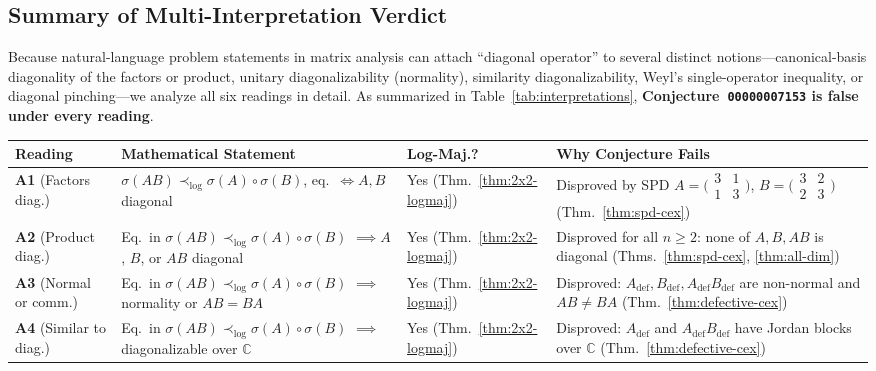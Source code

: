 \documentclass[11pt,a4paper]{article}
\theoremstyle{definition}
\newcommand{\C}{\mathbb{C}}
\begin{document}
\subsection{Summary of Multi-Interpretation Verdict}

Because natural-language problem statements in matrix analysis can attach ``diagonal operator'' to several distinct notions---canonical-basis diagonality of the factors or product, unitary diagonalizability (normality), similarity diagonalizability, Weyl's single-operator inequality, or diagonal pinching---we analyze all six readings in detail. As summarized in Table~\ref{tab:interpretations}, \textbf{Conjecture~\texttt{00000007153} is false under every reading}.

\begin{table}[ht]
\centering
\footnotesize
\begin{tabular}{@{}>{\raggedright\arraybackslash}p{2.6cm}>{\raggedright\arraybackslash}p{4.7cm}l>{\raggedright\arraybackslash}p{5.1cm}@{}}
\toprule
\textbf{Reading} & \textbf{Mathematical Statement} & \textbf{Log-Maj.?} & \textbf{Why Conjecture Fails} \\
\midrule
\textbf{A1} (Factors diag.) & $\sigma(AB) \prec_{\log} \sigma(A)\circ\sigma(B)$, eq.\ $\iff A, B$ diagonal & Yes (Thm.~\ref{thm:2x2-logmaj}) & Disproved by SPD $A=\bigl(\begin{smallmatrix}3&1\\1&3\end{smallmatrix}\bigr)$, $B=\bigl(\begin{smallmatrix}3&2\\2&3\end{smallmatrix}\bigr)$ (Thm.~\ref{thm:spd-cex}) \\
\addlinespace[3pt]
\textbf{A2} (Product diag.) & Eq.\ in $\sigma(AB) \prec_{\log} \sigma(A)\circ\sigma(B)$ $\implies A$, $B$, or $AB$ diagonal & Yes (Thm.~\ref{thm:2x2-logmaj}) & Disproved for all $n \ge 2$: none of $A,B,AB$ is diagonal (Thms.~\ref{thm:spd-cex}, \ref{thm:all-dim}) \\
\addlinespace[3pt]
\textbf{A3} (Normal or comm.) & Eq.\ in $\sigma(AB) \prec_{\log} \sigma(A)\circ\sigma(B)$ $\implies$ normality or $AB=BA$ & Yes (Thm.~\ref{thm:2x2-logmaj}) & Disproved: $A_{\mathrm{def}}, B_{\mathrm{def}}, A_{\mathrm{def}}B_{\mathrm{def}}$ are non-normal and $AB \ne BA$ (Thm.~\ref{thm:defective-cex}) \\
\addlinespace[3pt]
\textbf{A4} (Similar to diag.) & Eq.\ in $\sigma(AB) \prec_{\log} \sigma(A)\circ\sigma(B)$ $\implies$ diagonalizable over $\C$ & Yes (Thm.~\ref{thm:2x2-logmaj}) & Disproved: $A_{\mathrm{def}}$ and $A_{\mathrm{def}}B_{\mathrm{def}}$ have Jordan blocks over $\C$ (Thm.~\ref{thm:defective-cex}) \\

\end{tabular}
\end{table}
\end{document}
